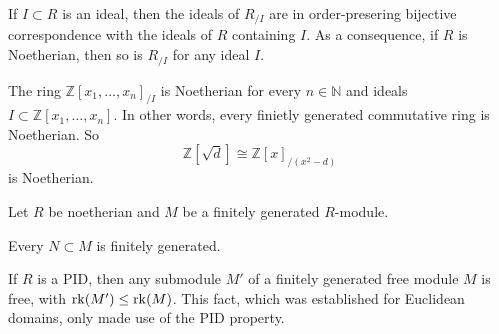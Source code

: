 If \(I \subset R\) is an ideal, then the ideals of \(R_{/I}\) are in order-presering bijective correspondence with the ideals of \(R\) containing \(I\).
As a consequence, if \(R\) is Noetherian, then so is \(R_{/I}\) for any ideal \(I\).
\begin{example}
   The ring \(\mathbb{Z}[x_1, \ldots, x_n]_{/I}\) is Noetherian for every \(n \in \mathbb{N}\) and ideals \(I \subset \mathbb{Z}[x_1, \ldots, x_n]\).
   In other words, every finietly generated commutative ring is Noetherian.
   So
   \[\mathbb{Z}[\sqrt{d}] \cong \mathbb{Z}[x]_{/(x^2 - d)}\]
   is Noetherian.
\end{example}

\begin{proposition}
   Let \(R\) be noetherian and \(M\) be a finitely generated \(R\)-module.

   Every \(N \subset M\) is finitely generated.
\end{proposition}
\begin{remark}
   If \(R\) is a PID, then any submodule \(M'\) of a finitely generated free module \(M\) is free, with \(\operatorname{rk}(M') \leq \operatorname{rk}(M)\).
   This fact, which was established for Euclidean domains, only made use of the PID property.
\end{remark}

